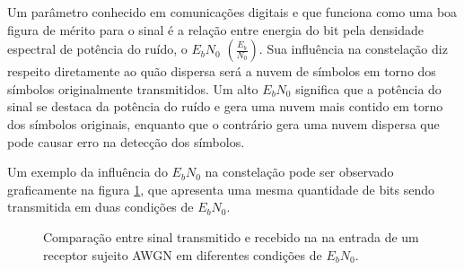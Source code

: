Um parâmetro conhecido em comunicações digitais e que funciona como uma boa figura de mérito para o sinal é a relação entre energia do bit pela densidade espectral de potência do ruído, o $E_bN_0$ $\left(\frac{E_b}{N_0}\right)$. Sua influência na constelação diz respeito diretamente ao quão dispersa será a nuvem de símbolos em torno dos símbolos originalmente transmitidos. Um alto $E_bN_0$ significa que a potência do sinal se destaca da potência do ruído e gera uma nuvem mais contido em torno dos símbolos originais, enquanto que o contrário gera uma nuvem dispersa que pode causar erro na detecção dos símbolos.

Um exemplo da influência do $E_bN_0$ na constelação pode ser observado graficamente na figura \ref{fig:noisy}, que apresenta uma mesma quantidade de bits sendo transmitida em duas condições de $E_bN_0$.

\begin{figure}[H]
\begin{center}
\end{center}
\caption{Comparação entre sinal transmitido e recebido na na entrada de um receptor sujeito AWGN em diferentes condições de $E_bN_0$.}
\label{fig:noisy} 
\end{figure}

